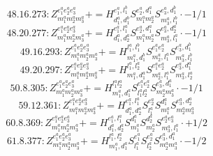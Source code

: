 \documentclass[letterpaper,10pt,fleqn,leqno,onecolumn]{article}
\begin{document}
\begin{equation} \;\;\;\;\;\;  48.16.273: Z^{e_{1}^{a}e_{2}^{a}e_{3}^{a}}_{m_{1}^{a}m_{2}^{a}m_{3}^{a}}+=H^{e_{1}^{a},l_{1}^{b}}_{d_{1}^{a},d_{1}^{b}}S^{e_{2}^{a},d_{1}^{a}}_{m_{1}^{a}m_{2}^{a}}S^{e_{3}^{a},d_{1}^{b}}_{m_{3}^{a},l_{1}^{b}}\cdot -1/1 \end{equation}
\begin{equation} \;\;\;\;\;\;  48.20.277: Z^{e_{1}^{a}e_{2}^{a}e_{3}^{a}}_{m_{1}^{a}m_{2}^{a}m_{3}^{a}}+=H^{e_{1}^{a},l_{1}^{a}}_{d_{1}^{a},d_{2}^{a}}S^{e_{2}^{a},d_{1}^{a}}_{m_{1}^{a}m_{2}^{a}}S^{e_{3}^{a},d_{2}^{a}}_{m_{3}^{a},l_{1}^{a}}\cdot -1/1 \end{equation}
\begin{equation} \;\;\;\;\;\;  49.16.293: Z^{e_{1}^{a}e_{2}^{a}e_{3}^{a}}_{m_{1}^{a}m_{2}^{a}m_{3}^{a}}+=H^{l_{1}^{a},l_{1}^{b}}_{m_{1}^{a},d_{1}^{b}}S^{e_{1}^{a}e_{2}^{a}}_{m_{2}^{a},l_{1}^{a}}S^{e_{3}^{a},d_{1}^{b}}_{m_{3}^{a},l_{1}^{b}} \end{equation}
\begin{equation} \;\;\;\;\;\;  49.20.297: Z^{e_{1}^{a}e_{2}^{a}e_{3}^{a}}_{m_{1}^{a}m_{2}^{a}m_{3}^{a}}+=H^{l_{1}^{a},l_{2}^{a}}_{m_{1}^{a},d_{1}^{a}}S^{e_{1}^{a}e_{2}^{a}}_{m_{2}^{a},l_{1}^{a}}S^{e_{3}^{a},d_{1}^{a}}_{m_{3}^{a},l_{2}^{a}} \end{equation}
\begin{equation} \;\;\;\;\;\;  50.8.305: Z^{e_{1}^{a}e_{2}^{a}e_{3}^{a}}_{m_{1}^{a}m_{2}^{a}m_{3}^{a}}+=H^{l_{1}^{a}l_{2}^{a}}_{m_{1}^{a},d_{1}^{a}}S^{e_{1}^{a}e_{2}^{a}}_{l_{1}^{a}l_{2}^{a}}S^{e_{3}^{a},d_{1}^{a}}_{m_{2}^{a}m_{3}^{a}}\cdot -1/1 \end{equation}
\begin{equation} \;\;\;\;\;\;  59.12.361: Z^{e_{1}^{a}e_{2}^{a}e_{3}^{a}}_{m_{1}^{a}m_{2}^{a}m_{3}^{a}}+=H^{e_{1}^{a},l_{1}^{a}}_{d_{1}^{a},d_{2}^{a}}S^{e_{2}^{a}}_{l_{1}^{a}}S^{d_{1}^{a}}_{m_{1}^{a}}S^{e_{3}^{a},d_{2}^{a}}_{m_{2}^{a}m_{3}^{a}} \end{equation}
\begin{equation} \;\;\;\;\;\;  60.8.369: Z^{e_{1}^{a}e_{2}^{a}e_{3}^{a}}_{m_{1}^{a}m_{2}^{a}m_{3}^{a}}+=H^{e_{1}^{a},l_{1}^{a}}_{d_{1}^{a},d_{2}^{a}}S^{d_{1}^{a}}_{m_{1}^{a}}S^{d_{2}^{a}}_{m_{2}^{a}}S^{e_{2}^{a}e_{3}^{a}}_{m_{3}^{a},l_{1}^{a}}\cdot +1/2 \end{equation}
\begin{equation} \;\;\;\;\;\;  61.8.377: Z^{e_{1}^{a}e_{2}^{a}e_{3}^{a}}_{m_{1}^{a}m_{2}^{a}m_{3}^{a}}+=H^{l_{1}^{a},l_{2}^{a}}_{m_{1}^{a},d_{1}^{a}}S^{e_{1}^{a}}_{l_{1}^{a}}S^{e_{2}^{a}}_{l_{2}^{a}}S^{e_{3}^{a},d_{1}^{a}}_{m_{2}^{a}m_{3}^{a}}\cdot -1/2 \end{equation}
\end{document}
